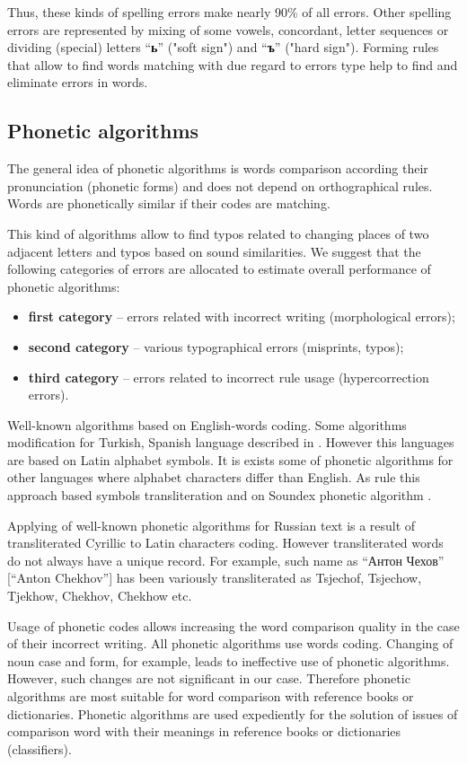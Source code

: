 \documentclass[conference,a4paper]{IEEEtran}
\begin{document}
Thus, these kinds of spelling errors make nearly 90\% of all errors. Other spelling errors are represented by mixing of some vowels, concordant, letter sequences or dividing (special) letters “\textbf{ь}” ("soft sign") and “\textbf{ъ}” ("hard sign"). Forming rules that allow to find words matching with due regard to errors type help to find and eliminate errors in words.

\subsection{Phonetic algorithms}
The general idea of phonetic algorithms is words comparison according their pronunciation (phonetic forms) and does not depend on orthographical rules. Words are phonetically similar if their codes are matching.

This kind of algorithms allow to find typos related to changing places of two adjacent letters and typos based on sound similarities. We suggest that the following categories of errors are allocated to estimate overall performance of phonetic algorithms:
\begin{itemize}
\item \textbf{first category} – errors related with incorrect writing (morphological errors);
\item \textbf{second category} – various typographical errors (misprints, typos);
\item \textbf{third category} – errors related to incorrect rule usage (hypercorrection \cite{Parubchenko-2005} errors).
\end{itemize}

Well-known algorithms based on English-words coding. Some algorithms modification for Turkish, Spanish language described in \cite{Alotaibi-2013}. However this languages are based on Latin alphabet symbols. It is exists some of phonetic algorithms for other languages where alphabet characters differ than English. As rule this approach based symbols transliteration and on Soundex phonetic algorithm \cite{Soundex}.

Applying of well-known phonetic algorithms for Russian text is a result of transliterated Cyrillic to Latin characters coding. However transliterated words do not always have a unique record. For example, such name as “Антон Чехов” [“Anton Chekhov”] has been variously transliterated as Tsjechof, Tsjechow, Tjekhow, Chekhov, Chekhow etc. 

Usage of phonetic codes allows increasing the word comparison quality in the case of their incorrect writing. All phonetic algorithms use words coding. Changing of noun case and form, for example, leads to ineffective use of phonetic algorithms. However, such changes are not significant in our case. Therefore phonetic algorithms are most suitable for word comparison with reference books or dictionaries. Phonetic algorithms are used expediently for the solution of issues of comparison word with their meanings in reference books or dictionaries (classifiers).
\end{document}
